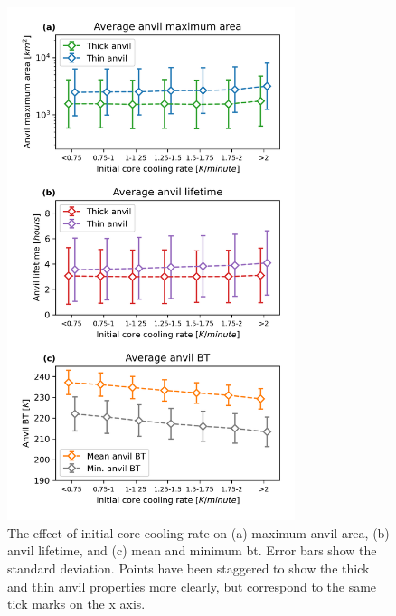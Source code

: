 \begin{figure}[tp]
    \centering
    \includegraphics[width=0.75\textwidth]{figures/chapter3_06.png}
    \caption[
    The effect of initial core cooling rate on maximum anvil area, anvil lifetime, and mean and minimum \acrshort{bt}
    ]{
    The effect of initial core cooling rate on (a) maximum anvil area, (b) anvil lifetime, and (c) mean and minimum \acrshort{bt}. Error bars show the standard deviation. Points have been staggered to show the thick and thin anvil properties more clearly, but correspond to the same tick marks on the x axis.
    }
    \label{fig:anvil_cooling_rate_properties}
\end{figure}

